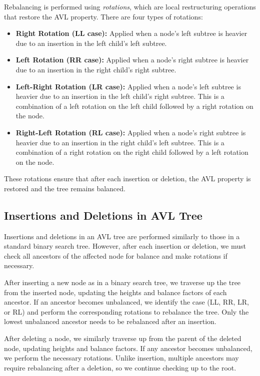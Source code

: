 \documentclass{article}
\begin{document}
Rebalancing is performed using \emph{rotations}, which are local restructuring operations that restore the AVL property. There are four types of rotations:
\begin{itemize}
    \item \textbf{Right Rotation (LL case):} Applied when a node's left subtree is heavier due to an insertion in the left child's left subtree.
    \item \textbf{Left Rotation (RR case):} Applied when a node's right subtree is heavier due to an insertion in the right child's right subtree.
    \item \textbf{Left-Right Rotation (LR case):} Applied when a node's left subtree is heavier due to an insertion in the left child's right subtree. This is a combination of a left rotation on the left child followed by a right rotation on the node.
    \item \textbf{Right-Left Rotation (RL case):} Applied when a node's right subtree is heavier due to an insertion in the right child's left subtree. This is a combination of a right rotation on the right child followed by a left rotation on the node.
\end{itemize}

These rotations ensure that after each insertion or deletion, the AVL property is restored and the tree remains balanced.

\subsection*{Insertions and Deletions in AVL Tree}
\label{avl_insertion_deletion}

Insertions and deletions in an AVL tree are performed similarly to those in a standard binary search tree. However, after each insertion or deletion, we must check all ancestors of the affected node for balance and make rotations if necessary.

After inserting a new node as in a binary search tree, we traverse up the tree from the inserted node, updating the heights and balance factors of each ancestor. If an ancestor becomes unbalanced, we identify the case (LL, RR, LR, or RL) and perform the corresponding rotations to rebalance the tree. Only the lowest unbalanced ancestor needs to be rebalanced after an insertion.

After deleting a node, we similarly traverse up from the parent of the deleted node, updating heights and balance factors. If any ancestor becomes unbalanced, we perform the necessary rotations. Unlike insertion, multiple ancestors may require rebalancing after a deletion, so we continue checking up to the root.
\end{document}
